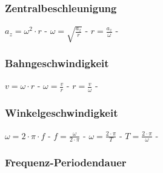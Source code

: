 \subsubsection{Zentralbeschleunigung} 
\begin{minipage}{0.45\textwidth} 
\end{minipage} 
\begin{minipage}{0.45\textwidth} 
 
\legende{}\end{minipage} 
 
$ a_{z}  = \omega ^{2} \cdot r $ - $ \omega  = \sqrt{\frac{a_{z} }{r}} $ - $ r = \frac{a_{z} }{\omega } $ - \\ 
 
\subsubsection{Bahngeschwindigkeit} 
\begin{minipage}{0.45\textwidth} 
\end{minipage} 
\begin{minipage}{0.45\textwidth} 
 
\legende{}\end{minipage} 
 
$ v = \omega \cdot r $ - $ \omega  = \frac{v}{r} $ - $ r = \frac{v}{\omega } $ - \\ 
 
\subsubsection{Winkelgeschwindigkeit} 
\begin{minipage}{0.45\textwidth} 
\end{minipage} 
\begin{minipage}{0.45\textwidth} 
 
\legende{}\end{minipage} 
 
$ \omega  = 2\cdot \pi \cdot f $ - $ f = \frac{\omega }{2\cdot \pi } $ - $ \omega  = \frac{2\cdot \pi }{ T} $ - $ T = \frac{2\cdot \pi }{ \omega } $ - \\ 
 
\subsubsection{Frequenz-Periodendauer} 
\begin{minipage}{0.45\textwidth} 
\end{minipage} 
\begin{minipage}{0.45\textwidth} 
 
\legende{}\end{minipage} 
 
